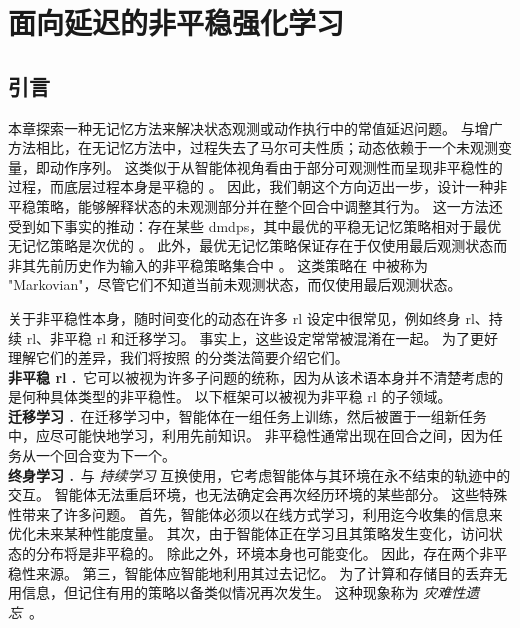 \chapter{面向延迟的非平稳强化学习}
\label{chap:lifelong}


\section{引言}
本章探索一种无记忆方法来解决状态观测或动作执行中的常值延迟问题。
与增广方法相比，在无记忆方法中，过程失去了马尔可夫性质；动态依赖于一个未观测变量，即动作序列。
这类似于从智能体视角看由于部分可观测性而呈现非平稳性的过程，而底层过程本身是平稳的 \cite[Section~2.1]{khetarpal2020towards}。
因此，我们朝这个方向迈出一步，设计一种非平稳策略，能够解释状态的未观测部分并在整个回合中调整其行为。
这一方法还受到如下事实的推动：存在某些 \glspl{dmdp}，其中最优的平稳无记忆策略相对于最优无记忆策略是次优的 \cite[Proposition~5.2]{derman2021acting}。
此外，最优无记忆策略保证存在于仅使用最后观测状态而非其先前历史作为输入的非平稳策略集合中 \cite[Theorem~5.1]{derman2021acting}。
这类策略在 \cite{derman2021acting} 中被称为 "Markovian"，尽管它们不知道当前未观测状态，而仅使用最后观测状态。

关于非平稳性本身，随时间变化的动态在许多 \gls{rl} 设定中很常见，例如终身 \gls{rl}、持续 \gls{rl}、非平稳 \gls{rl} 和迁移学习。
事实上，这些设定常常被混淆在一起。
为了更好理解它们的差异，我们将按照 \cite{khetarpal2020towards} 的分类法简要介绍它们。
\\
\noindent\textbf{非平稳 \gls{rl} \cite{bowerman1974nonstationary}.}~\indent 它可以被视为许多子问题的统称，因为从该术语本身并不清楚考虑的是何种具体类型的非平稳性。
以下框架可以被视为非平稳 \gls{rl} 的子领域。
\\
\noindent\textbf{迁移学习 \cite{taylor2009transfer}.}~\indent 在迁移学习中，智能体在一组任务上训练，然后被置于一组新任务中，应尽可能快地学习，利用先前知识。
非平稳性通常出现在回合之间，因为任务从一个回合变为下一个。
\\
\noindent\textbf{终身学习 \cite{chen2018lifelong}.}~\indent 与 \emph{持续学习} 互换使用，它考虑智能体与其环境在永不结束的轨迹中的交互。
智能体无法重启环境，也无法确定会再次经历环境的某些部分。
这些特殊性带来了许多问题。
首先，智能体必须以在线方式学习，利用迄今收集的信息来优化未来某种性能度量。
其次，由于智能体正在学习且其策略发生变化，访问状态的分布将是非平稳的。
除此之外，环境本身也可能变化。
因此，存在两个非平稳性来源。
第三，智能体应智能地利用其过去记忆。
为了计算和存储目的丢弃无用信息，但记住有用的策略以备类似情况再次发生。
这种现象称为 \emph{灾难性遗忘}~\cite{mccloskey1989catastrophic,french1999catastrophic}。

